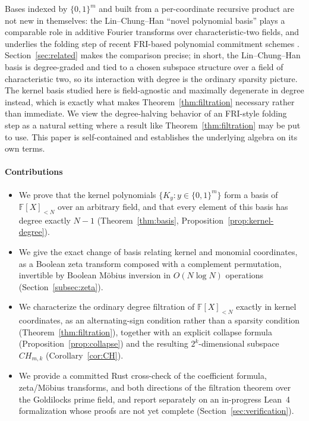 \documentclass[preprint,3p,12pt,numbers]{elsarticle}
\theoremstyle{definition}
\theoremstyle{remark}
\begin{document}
Bases indexed by $\{0,1\}^m$ and built from a per-coordinate recursive
product are not new in themselves: the Lin--Chung--Han ``novel polynomial
basis'' \citep{LinChungHan2014} plays a comparable role in additive Fourier
transforms over characteristic-two fields, and underlies the folding step
of recent FRI-based polynomial commitment schemes
\citep{ZeilbergerChenFisch2024Basefold,DiamondPosen2026FRIBinius}.
Section~\ref{sec:related} makes the comparison precise; in short, the
Lin--Chung--Han basis is degree-graded and tied to a chosen subspace
structure over a field of characteristic two, so its interaction with
degree is the ordinary sparsity picture. The kernel basis studied here is
field-agnostic and maximally degenerate in degree instead, which is
exactly what makes Theorem~\ref{thm:filtration} necessary rather than
immediate. We view the degree-halving behavior of an FRI-style folding
step as a natural setting where a result like
Theorem~\ref{thm:filtration} may be put to use. This paper is
self-contained and establishes the underlying algebra on its own terms.

\paragraph{Contributions}
\begin{itemize}
\item We prove that the kernel polynomials $\{K_y : y \in \{0,1\}^m\}$
  form a basis of $\mathbb{F}[X]_{<N}$ over an arbitrary field, and that
  every element of this basis has degree exactly $N-1$
  (Theorem~\ref{thm:basis}, Proposition~\ref{prop:kernel-degree}).
\item We give the exact change of basis relating kernel and monomial
  coordinates, as a Boolean zeta transform composed with a complement
  permutation, invertible by Boolean M\"obius inversion in
  $O(N \log N)$ operations (Section~\ref{subsec:zeta}).
\item We characterize the ordinary degree filtration of
  $\mathbb{F}[X]_{<N}$ exactly in kernel coordinates, as an
  alternating-sign condition rather than a sparsity condition
  (Theorem~\ref{thm:filtration}), together with an explicit collapse
  formula (Proposition~\ref{prop:collapse}) and the resulting
  $2^k$-dimensional subspace $CH_{m,k}$ (Corollary~\ref{cor:CH}).
\item We provide a committed Rust cross-check of the coefficient
  formula, zeta/M\"obius transforms, and both directions of the filtration
  theorem over the Goldilocks prime field, and report separately on an
  in-progress Lean~4 formalization whose proofs are not yet complete
  (Section~\ref{sec:verification}).
\end{itemize}
\end{document}
